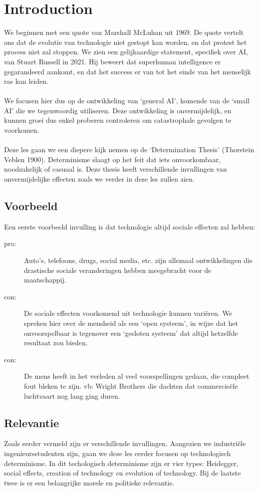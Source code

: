 \documentclass[../summary.tex]{subfiles}
\begin{document}
	
	\section{Introduction}
	We beginnen met een quote van Marshall McLuhan uit 1969. De quote vertelt ons dat de evolutie van technologie niet gestopt kan worden, en dat protest het process niet zal stoppen. We zien een gelijkaardige statement, specifiek over AI, van Stuart Russell in 2021. Hij beweert dat superhuman intelligence er gegarandeerd aankomt, en dat het success er van tot het einde van het menselijk ras kan leiden.  \\
	\\
	We focusen hier dus op de ontwikkeling van `general AI', komende van de `small AI' die we tegenwoordig utiliseren. Deze ontwikkeling is onvermijdelijk, en kunnen groei dus enkel proberen controleren om catastrophale gevolgen te voorkomen. \\
	\\	
	Deze les gaan we een diepere kijk nemen op de `Determination Thesis' (Thorstein Veblen 1900). Determinisme slaagt op het feit dat iets onvoorkombaar, noodzakelijk of casuaal is. Deze thesis heeft verschillende invullingen van onvermijdelijke effecten zoals we verder in deze les zullen zien.  \\
	
	\subsection{Voorbeeld}
	Een eerste voorbeeld invulling is dat technologie altijd sociale effecten zal hebben:
	\begin{description}
		\item[pro:] Auto's, telefoons, drugs, social media, etc. zijn allemaal ontwikkelingen die drastische sociale veranderingen hebben meegebracht voor de maatschappij.
		\item[con:] De sociale effecten voorkomend uit technologie kunnen variëren. We spreken hier over de mensheid als een `open systeem', in wijze dat het onvoorspelbaar is tegenover een `gesloten systeem' dat altijd hetzelfde resultaat zou bieden.
		\item[con:]  De mens heeft in het verleden al veel voorspellingen gedaan, die compleet fout bleken te zijn. vb: Wright Brothers die dachten dat commercieële luchtvaart nog lang ging duren.
	\end{description}
	
	\subsection{Relevantie}
	Zoals eerder vermeld zijn er verschillende invullingen. Aangezien we industriële ingenieursstudenten zijn, gaan we deze les eerder focusen op technologisch determinisme. In dit techologisch determinisme zijn er vier types: Heidegger, social effects, creation of technology en evolution of technology. Bij de laatste twee is er een belangrijke morele en politieke relevantie.
	
\end{document}
